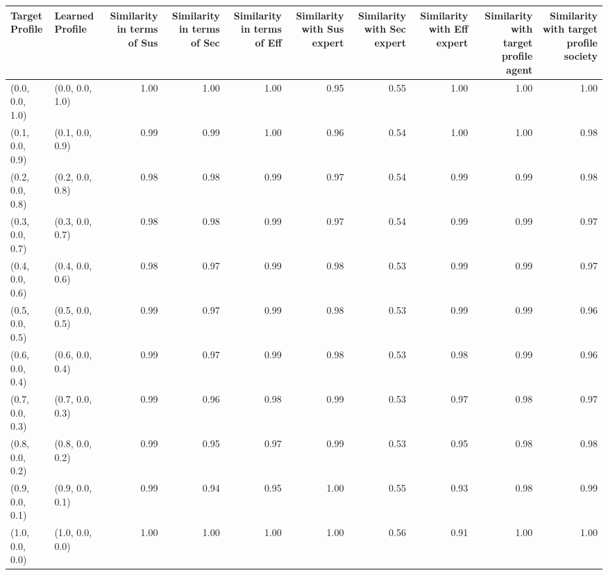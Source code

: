 \begin{tabular}{llrrrrrrrr}
\toprule
Target Profile & Learned Profile & Similarity in terms of Sus & Similarity in terms of Sec & Similarity in terms of Eff & Similarity with Sus expert & Similarity with Sec expert & Similarity with Eff expert & Similarity with target profile agent & Similarity with target profile society \\
\midrule
(0.0, 0.0, 1.0) & (0.0, 0.0, 1.0) & 1.00 & 1.00 & 1.00 & 0.95 & 0.55 & 1.00 & 1.00 & 1.00 \\
(0.1, 0.0, 0.9) & (0.1, 0.0, 0.9) & 0.99 & 0.99 & 1.00 & 0.96 & 0.54 & 1.00 & 1.00 & 0.98 \\
(0.2, 0.0, 0.8) & (0.2, 0.0, 0.8) & 0.98 & 0.98 & 0.99 & 0.97 & 0.54 & 0.99 & 0.99 & 0.98 \\
(0.3, 0.0, 0.7) & (0.3, 0.0, 0.7) & 0.98 & 0.98 & 0.99 & 0.97 & 0.54 & 0.99 & 0.99 & 0.97 \\
(0.4, 0.0, 0.6) & (0.4, 0.0, 0.6) & 0.98 & 0.97 & 0.99 & 0.98 & 0.53 & 0.99 & 0.99 & 0.97 \\
(0.5, 0.0, 0.5) & (0.5, 0.0, 0.5) & 0.99 & 0.97 & 0.99 & 0.98 & 0.53 & 0.99 & 0.99 & 0.96 \\
(0.6, 0.0, 0.4) & (0.6, 0.0, 0.4) & 0.99 & 0.97 & 0.99 & 0.98 & 0.53 & 0.98 & 0.99 & 0.96 \\
(0.7, 0.0, 0.3) & (0.7, 0.0, 0.3) & 0.99 & 0.96 & 0.98 & 0.99 & 0.53 & 0.97 & 0.98 & 0.97 \\
(0.8, 0.0, 0.2) & (0.8, 0.0, 0.2) & 0.99 & 0.95 & 0.97 & 0.99 & 0.53 & 0.95 & 0.98 & 0.98 \\
(0.9, 0.0, 0.1) & (0.9, 0.0, 0.1) & 0.99 & 0.94 & 0.95 & 1.00 & 0.55 & 0.93 & 0.98 & 0.99 \\
(1.0, 0.0, 0.0) & (1.0, 0.0, 0.0) & 1.00 & 1.00 & 1.00 & 1.00 & 0.56 & 0.91 & 1.00 & 1.00 \\
\bottomrule
\end{tabular}
